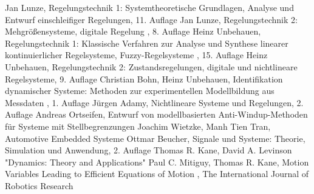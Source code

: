 \begin{thebibliography}{999}%
 Jan Lunze, \glqq Regelungstechnik 1: Systemtheoretische Grundlagen, Analyse und Entwurf einschleifiger Regelungen\grqq , 11. Auflage
 Jan Lunze, \glqq Regelungstechnik 2: Mehgrößensysteme, digitale Regelung \grqq , 8. Auflage
 Heinz Unbehauen, \glqq Regelungstechnik 1: Klassische Verfahren zur Analyse und Synthese linearer kontinuierlicher Regelsysteme, Fuzzy-Regelsysteme \grqq , 15. Auflage
 Heinz Unbehauen, \glqq Regelungstechnik 2: Zustandsregelungen, digitale und nichtlineare Regelsysteme\grqq , 9. Auflage
 Christian Bohn, Heinz Unbehauen, \glqq Identifikation dynamischer Systeme: Methoden zur experimentellen Modellbildung aus Messdaten \grqq , 1. Auflage
 Jürgen Adamy, \glqq Nichtlineare Systeme und Regelungen\grqq , 2. Auflage
 Andreas Ortseifen, \glqq Entwurf von modellbasierten Anti-Windup-Methoden für Systeme mit Stellbegrenzungen\grqq
{} Joachim Wietzke, Manh Tien Tran, \glqq Automotive Embedded Systeme\grqq
{} Ottmar Beucher, \glqq Signale und Systeme: Theorie, Simulation und Anwendung\grqq , 2. Auflage
 Thomas R. Kane, David A. Levinson "Dynamics: Theory and Applications"
 Paul C. Mitiguy, Thomas R. Kane, \glqq Motion Variables Leading to Efficient Equations of Motion \grqq, The International Journal of Robotics Research

\end{thebibliography}